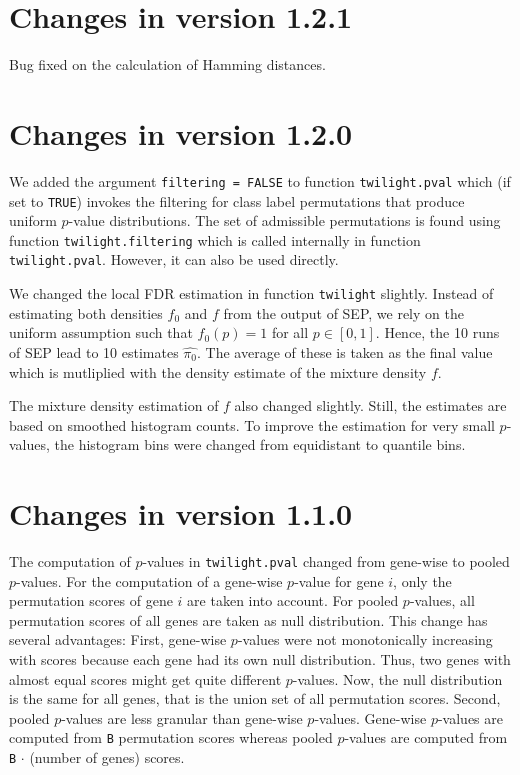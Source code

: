 \documentclass[11pt,a4paper,fleqn]{report}
\newcommand{\Rfunction}[1]{{\texttt{#1}}}
\newcommand{\Rfunarg}[1]{{\texttt{#1}}}
\begin{document}
\section*{Changes in version 1.2.1}

Bug fixed on the calculation of Hamming distances.


\section*{Changes in version 1.2.0}

We added the argument \Rfunarg{filtering = FALSE} to function \Rfunction{twilight.pval} which (if set to \Rfunarg{TRUE}) invokes the filtering for class label permutations that produce uniform $p$-value distributions. The set of admissible permutations is found using function \Rfunarg{twilight.filtering} which is called internally in function \Rfunarg{twilight.pval}. However, it can also be used directly.

We changed the local FDR estimation in function \Rfunction{twilight} slightly. Instead of estimating both densities $f_0$ and $f$ from the output of SEP, we rely on the uniform assumption such that $f_0(p)=1$ for all $p \in [0,1]$. Hence, the 10 runs of SEP lead to 10 estimates $\widehat{\pi_0}$. The average of these is taken as the final value which is mutliplied with the density estimate of the mixture density $f$.

The mixture density estimation of $f$ also changed slightly. Still, the estimates are based on smoothed histogram counts. To improve the estimation for very small $p$-values, the histogram bins were changed from equidistant to quantile bins.
       
       
\section*{Changes in version 1.1.0}

The computation of $p$-values in \Rfunction{twilight.pval} changed from gene-wise to pooled $p$-values. For the computation of a gene-wise $p$-value for gene $i$, only the permutation scores of gene $i$ are taken into account. For pooled $p$-values, all permutation scores of all genes are taken as null distribution. This change has several advantages: First, gene-wise $p$-values were not monotonically increasing with scores because each gene had its own null distribution. Thus, two genes with almost equal scores might get quite different $p$-values. Now, the null distribution is the same for all genes, that is the union set of all permutation scores. Second, pooled $p$-values are less granular than gene-wise $p$-values. Gene-wise $p$-values are computed from \Rfunarg{B} permutation scores whereas pooled $p$-values are computed from \Rfunarg{B} $\cdot$ (number of genes) scores.
\end{document}
